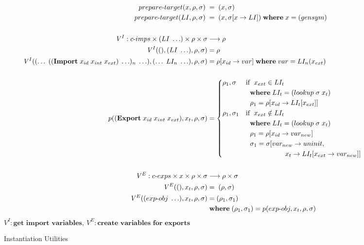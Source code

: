 \documentclass[sigplan,screen,anonymous]{acmart}
\def\dash {\text{-}}
\begin{document}
\begin{figure*}[tbp]
  \begin{align*}
    prepare\dash target(x, \rho, \sigma)\; &=\; (x, \sigma) \\
    prepare\dash target(LI, \rho, \sigma)\; &=\; (x, \sigma[x\rightarrow LI])\; \where x = (gensym) \\ \\
    \mathit{V}^I : c\dash imps \times (LI\;\ldots) \times \rho \times \sigma &\longrightarrow \rho \\
    \mathit{V}^I((), (LI\;\ldots), \rho, \sigma) &= \rho \\
    \mathit{V}^I((\ldots\;((\textbf{Import}\; x_{id}\;x_{int}\;x_{ext})\;\ldots)_n\;\ldots), (\ldots\;LI_n\;\ldots), \rho, \sigma) &= \rho[x_{id}\rightarrow var]\; \where var = LI_n(x_{ext}) \\ \\
    p((\textbf{Export}\;x_{id}\;x_{int}\;x_{ext}), x_t, \rho, \sigma) &= \begin{cases*}
      \rho_1, \sigma & if $\;x_{ext} \in LI_t$ \\
      \;        &\; \where $LI_t = (lookup\; \sigma\; x_t)$ \\
      \;        &\; $\rho_1 = \rho[x_{id}\rightarrow LI_t[x_{ext}]]$ \\
        \rho_1, \sigma_1 & if $\;x_{ext} \notin LI_t$\\
        \;        &\; \where $LI_t = (lookup\; \sigma\; x_t)$ \\
        \;        &\; $\rho_1 = \rho[x_{id}\rightarrow var_{new}]$ \\
        \;        &\; $\sigma_1 = \sigma[var_{new}\rightarrow uninit,$ \\
        \;        &\; \hspace{1.7cm} $x_t\rightarrow LI_t[x_{ext}\rightarrow var_{new}]]$ \\
    \end{cases*} \\ \\
    \mathit{V}^E : c\dash exps \times x \times \rho \times \sigma &\longrightarrow \rho \times \sigma \\
    \mathit{V}^E((), x_t, \rho, \sigma) &=\; (\rho, \sigma) \\
    \mathit{V}^E((exp\dash obj\;\ldots), x_t, \rho, \sigma) &= (\rho_1, \sigma_1)\\
    \;        &\; \where (\rho_1, \sigma_1) = p(exp\dash obj, x_t, \rho, \sigma) \\
  \end{align*}
  \hfill \footnotesize $\mathit{V}^I : \textbf{get  import variables},\: \mathit{V}^E : \textbf{create variables for exports}$
\caption{Instantiation Utilities}
\label{fig:inst-utils}
\end{figure*}
\end{document}
